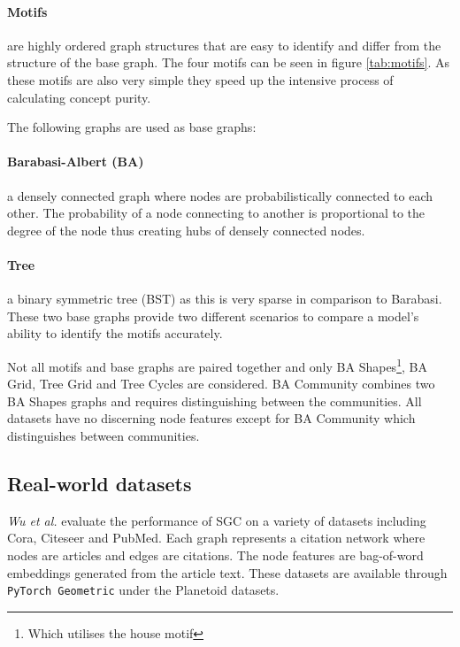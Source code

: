 \paragraph{Motifs}

are highly ordered graph structures that are easy to identify and differ from the structure of the base graph.
The four motifs can be seen in figure \ref{tab:motifs}.
As these motifs are also very simple they speed up the intensive process of calculating concept purity.

The following graphs are used as base graphs:

\paragraph{Barabasi-Albert (BA)}
a densely connected graph where nodes are probabilistically connected to each other.
The probability of a node connecting to another is proportional to the degree of the node thus creating hubs of densely connected nodes.

\paragraph{Tree}
a binary symmetric tree (BST) as this is very sparse in comparison to Barabasi.
These two base graphs provide two different scenarios to compare a model's ability to identify the motifs accurately.

Not all motifs and base graphs are paired together and only BA Shapes\footnote{Which utilises the house motif}, BA Grid, Tree Grid and Tree Cycles are considered.
BA Community combines two BA Shapes graphs and requires distinguishing between the communities.
All datasets have no discerning node features except for BA Community which distinguishes between communities.

\subsection{Real-world datasets}
\label{sec:RWD}


\textit{Wu et al.}\cite{wu2019simplifying} evaluate the performance of SGC on a variety of datasets including Cora, Citeseer and PubMed\cite{citation}.
Each graph represents a citation network where nodes are articles and edges are citations.
The node features are bag-of-word embeddings generated from the article text.
These datasets are available through \texttt{PyTorch Geometric}\cite{Fey/Lenssen/2019} under the Planetoid\cite{planetoid} datasets.

